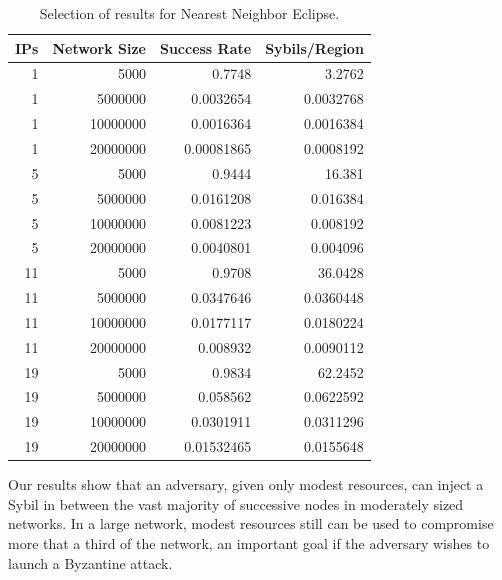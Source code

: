 \documentclass[11pt,conference]{IEEEtran}
\begin{document}
\begin{table}\small
	\centering
       \caption{Selection of results for Nearest Neighbor Eclipse.}  %
       \label{tab:exp2}
\begin{tabular}{|r|r|r|r|}
    \hline
    IPs & Network Size &  Success Rate & Sybils/Region \\ \hline
1 & 5000 & 0.7748 & 3.2762 \\ \hline
1 & 5000000 & 0.0032654 & 0.0032768 \\ \hline
1& 10000000 & 0.0016364 & 0.0016384 \\ \hline
1 & 20000000 & 0.00081865 & 0.0008192 \\ \hline
5 & 5000 & 0.9444 & 16.381 \\ \hline
5 & 5000000 & 0.0161208 & 0.016384 \\ \hline
5 & 10000000 & 0.0081223 & 0.008192 \\ \hline
5 & 20000000 & 0.0040801 & 0.004096 \\ \hline
11 & 5000 & 0.9708 & 36.0428 \\ \hline
11 & 5000000 & 0.0347646 & 0.0360448 \\ \hline
11 & 10000000 & 0.0177117 & 0.0180224 \\ \hline
11 & 20000000 & 0.008932 & 0.0090112 \\ \hline
19 & 5000 & 0.9834 & 62.2452 \\ \hline
19 & 5000000 & 0.058562 & 0.0622592 \\ \hline
19 & 10000000 & 0.0301911 & 0.0311296 \\ \hline
19 & 20000000 & 0.01532465 & 0.0155648 \\ \hline
\end{tabular}


\end{table}

Our results show that an adversary, given only modest resources, can inject a Sybil in between the vast majority of successive nodes in moderately sized networks.
In a large network, modest resources still can be used to compromise more that a third of the network, an  important goal if the adversary  wishes to launch a Byzantine attack.
\end{document}
